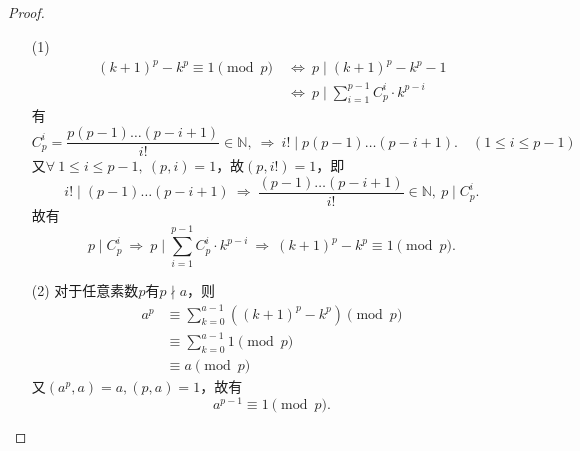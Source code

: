 \documentclass[UTF8]{ctexart}
\begin{document}
\subsection{}   %
\begin{proof}
    \begin{enumerate}
        \item []
        \item [(1)]
        \begin{align*}
            {(k+1)}^p - k^p \equiv 1 \pmod{p}\ 
            & \Leftrightarrow\ 
            p\mid {(k+1)}^p - k^p -1 \\
            & \Leftrightarrow\ 
            p\mid \sum\limits_{i=1}^{p-1} C_{p}^{i}\cdot k^{p-i}
        \end{align*}
        有
        \[
            C_{p}^{i}=
            \displaystyle{
                \frac{p(p-1)\ldots (p-i+1)}{i!}
            }
            \in \mathbb{N},
            \ \Rightarrow\ 
            i! \mid p(p-1)\ldots (p-i+1).
            \quad (1\leq i \leq p-1)
        \]
        又$\forall\ 1\leq i\leq p-1,\ (p,i)=1$，故$(p,i!)=1$，即
        \[
            i!\mid (p-1)\ldots (p-i+1)
            \ \Rightarrow\ 
            \displaystyle{
                \frac{(p-1)\ldots(p-i+1)}{i!}
            }
            \in \mathbb{N},\ 
            p\mid C_{p}^{i}.
        \]
        故有
        \[
            p\mid C_{p}^{i}
            \ \Rightarrow\ 
            p\mid \sum\limits_{i=1}^{p-1} C_{p}^{i}\cdot k^{p-i}
            \ \Rightarrow\ 
            {(k+1)}^p - k^p \equiv 1 \pmod{p}.
        \]
        \item [(2)]对于任意素数$p$有$p\nmid a$，则
        \[
            \begin{aligned}
                a^{p}
                & \equiv 
                \sum\limits_{k=0}^{a-1} \left({(k+1)}^{p} - {k}^{p} \right) \pmod{p}\\
                & \equiv 
                \sum\limits_{k=0}^{a-1} 1 \pmod{p}\\
                & \equiv
                a \pmod{p}
            \end{aligned}
        \]
        又$(a^p,a)=a,(p,a)=1$，故有
        \[
            a^{p-1} \equiv 1 \pmod{p}.
        \]
    \end{enumerate}
\end{proof}
\end{document}
